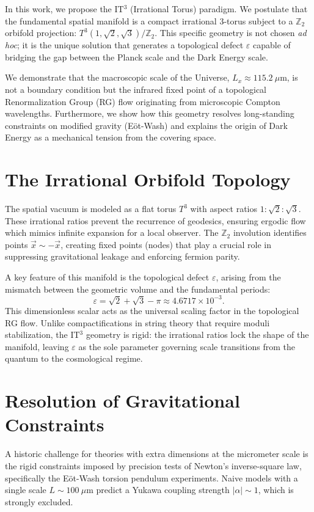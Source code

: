 \documentclass[aps,prd,twocolumn,groupedaddress,superscriptaddress,amsmath,amssymb]{revtex4-2}
\begin{document}
In this work, we propose the IT$^3$ (Irrational Torus) paradigm. We postulate that the fundamental spatial manifold is a compact irrational 3-torus subject to a $\mathbb{Z}_2$ orbifold projection: $T^3(1,\sqrt{2},\sqrt{3})/\mathbb{Z}_2$. This specific geometry is not chosen \textit{ad hoc}; it is the unique solution that generates a topological defect $\varepsilon$ capable of bridging the gap between the Planck scale and the Dark Energy scale.

We demonstrate that the macroscopic scale of the Universe, $L_x \approx 115.2~\mu\text{m}$, is not a boundary condition but the infrared fixed point of a topological Renormalization Group (RG) flow originating from microscopic Compton wavelengths. Furthermore, we show how this geometry resolves long-standing constraints on modified gravity (Eöt-Wash) and explains the origin of Dark Energy as a mechanical tension from the covering space.

\section{The Irrational Orbifold Topology}
The spatial vacuum is modeled as a flat torus $T^3$ with aspect ratios $1 : \sqrt{2} : \sqrt{3}$. These irrational ratios prevent the recurrence of geodesics, ensuring ergodic flow which mimics infinite expansion for a local observer. The $\mathbb{Z}_2$ involution identifies points $\vec{x} \sim -\vec{x}$, creating fixed points (nodes) that play a crucial role in suppressing gravitational leakage and enforcing fermion parity.

A key feature of this manifold is the topological defect $\varepsilon$, arising from the mismatch between the geometric volume and the fundamental periods:
\begin{equation}
    \varepsilon = \sqrt{2} + \sqrt{3} - \pi \approx 4.6717 \times 10^{-3}.
\end{equation}
This dimensionless scalar acts as the universal scaling factor in the topological RG flow. Unlike compactifications in string theory that require moduli stabilization, the IT$^3$ geometry is rigid: the irrational ratios lock the shape of the manifold, leaving $\varepsilon$ as the sole parameter governing scale transitions from the quantum to the cosmological regime.

\section{Resolution of Gravitational Constraints}
A historic challenge for theories with extra dimensions at the micrometer scale is the rigid constraints imposed by precision tests of Newton's inverse-square law, specifically the Eöt-Wash torsion pendulum experiments. Naive models with a single scale $L \sim 100~\mu\text{m}$ predict a Yukawa coupling strength $|\alpha| \sim 1$, which is strongly excluded.
\end{document}
